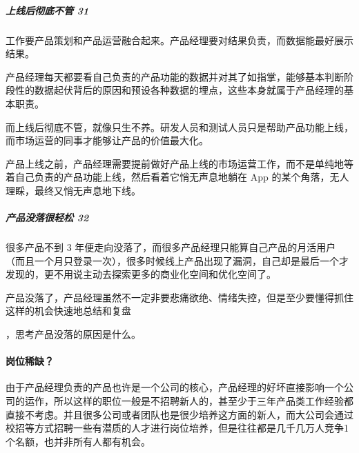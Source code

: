 \documentclass[letterpaper,11pt,english]{sphinxmanual}
\begin{document}
\subparagraph{上线后彻底不管 31\sphinxfootnotemark[140]}
\label{\detokenize{chapter_introduction/PM:id14}}%
\begin{footnotetext}[140]\sphinxAtStartFootnote
{}
%
\end{footnotetext}\ignorespaces 
工作要产品策划和产品运营融合起来。产品经理要对结果负责，而数据能最好展示结果。

产品经理每天都要看自己负责的产品功能的数据并对其了如指掌，能够基本判断阶段性的数据起伏背后的原因和预设各种数据的埋点，这些本身就属于产品经理的基本职责。

而上线后彻底不管，就像只生不养。研发人员和测试人员只是帮助产品功能上线，而市场运营的同事才能够让产品的价值最大化。

产品上线之前，产品经理需要提前做好产品上线的市场运营工作，而不是单纯地等着自己负责的产品功能上线，然后看着它悄无声息地躺在
App 的某个角落，无人理睬，最终又悄无声息地下线。


\subparagraph{产品没落很轻松 32\sphinxfootnotemark[141]}
\label{\detokenize{chapter_introduction/PM:id15}}%
\begin{footnotetext}[141]\sphinxAtStartFootnote
{}
%
\end{footnotetext}\ignorespaces 
很多产品不到 3
年便走向没落了，而很多产品经理只能算自己产品的月活用户（而且一个月只登录一次），很多时候线上产品出现了漏洞，自己却是最后一个才发现的，更不用说主动去探索更多的商业化空间和优化空间了。

产品没落了，产品经理虽然不一定非要悲痛欲绝、情绪失控，但是至少要懂得抓住这样的机会快速地总结和复盘%
\begin{footnote}[142]\sphinxAtStartFootnote
{}
%
\end{footnote}，思考产品没落的原因是什么。


\paragraph{岗位稀缺？}
\label{\detokenize{chapter_introduction/PM:id16}}
由于产品经理负责的产品也许是一个公司的核心，产品经理的好坏直接影响一个公司的运作，所以这样的职位一般是不招聘新人的，甚至少于三年产品类工作经验都直接不考虑。并且很多公司或者团队也是很少培养这方面的新人，而大公司会通过校招等方式招聘一些有潜质的人才进行岗位培养，但是往往都是几千几万人竞争1个名额，也并非所有人都有机会。
%
\begin{footnote}[143]\sphinxAtStartFootnote
{}
%
\end{footnote}
\end{document}
